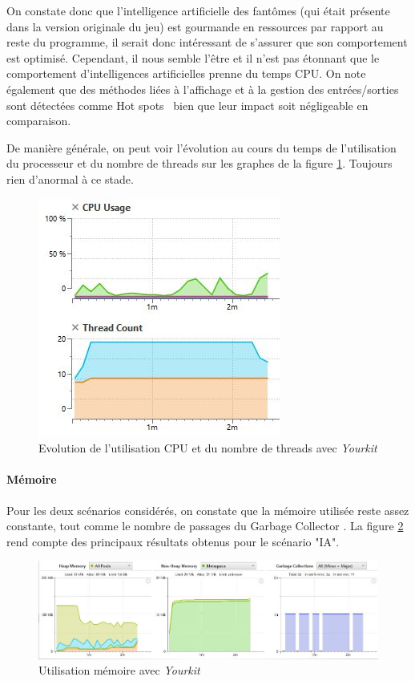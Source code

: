 \documentclass[12pt, openany]{report}
\begin{document}
On constate donc que l'intelligence artificielle des fantômes (qui était présente dans la version originale du jeu) est gourmande en ressources par rapport au reste du programme, il serait donc intéressant de s'assurer que son comportement est optimisé. Cependant, il nous semble l'être et il n'est pas étonnant que le comportement d'intelligences artificielles prenne du temps CPU. On note également que des méthodes liées à l'affichage et à la gestion des entrées/sorties sont détectées comme \og Hot spots \fg \, bien que leur impact soit négligeable en comparaison.

De manière générale, on peut voir l'évolution au cours du temps de l'utilisation du processeur et du nombre de threads sur les graphes de la figure \ref{cpu-threads}. Toujours rien d'anormal à ce stade.
\begin{figure}[h]
	\centering
	\includegraphics{Images/cpu-threads.JPG}
	\caption{\label{cpu-threads} Evolution de l'utilisation CPU et du nombre de threads avec \textit{Yourkit}}
\end{figure}
\paragraph{Mémoire}
Pour les deux scénarios considérés, on constate que la mémoire utilisée reste assez constante, tout comme le nombre de passages du \og Garbage Collector \fg. La figure \ref{memory} rend compte des principaux résultats obtenus pour le scénario "IA".
\begin{figure}[h]
	\centering
	\includegraphics[width=16cm]{Images/memory.JPG}
	\caption{\label{memory} Utilisation mémoire avec \textit{Yourkit}}
\end{figure}
\end{document}
